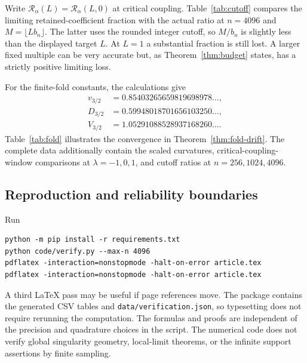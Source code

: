 \documentclass[11pt,a4paper]{article}
\numberwithin{equation}{section}
\theoremstyle{definition}
\theoremstyle{remark}
\newcommand{\Ra}{\mathcal R_\alpha}
\begin{document}
Write $\Ra(L)=\Ra(L,0)$ at critical coupling. Table~\ref{tab:cutoff}
compares the limiting retained-coefficient fraction with the actual
ratio at $n=4096$ and $M=\lfloor Lb_n\rfloor$. The latter uses the rounded
integer cutoff, so $M/b_n$ is slightly less than the displayed target
$L$. At $L=1$ a substantial fraction is still lost. A larger fixed
multiple can be very accurate but, as Theorem~\ref{thm:budget} states,
has a strictly positive limiting loss.
\begin{table}[htbp]
\centering\small

\caption{Critical action-cutoff profile and finite-sector diagnostics.
The two quadrature resolutions differed by at most $2.34\times10^{-12}$
in the computed truncated densities; this difference is a diagnostic,
not a rigorous error bound.}
\label{tab:cutoff}
\end{table}

For the finite-fold constants, the calculations give
\begin{align*}
 v_{3/2}&=0.85403265659819698978\ldots,\\
 D_{3/2}&=0.59948018701656103250\ldots,\\
 V_{3/2}&=1.05291088528937168260\ldots.
\end{align*}
Table~\ref{tab:fold} illustrates the convergence in
Theorem~\ref{thm:fold-drift}. The complete data additionally contain the
scaled curvatures, critical-coupling-window comparisons at
$\lambda=-1,0,1$, and cutoff ratios at $n=256,1024,4096$.
\begin{table}[htbp]
\centering\small

\caption{Moving finite-action folds. The two columns converge to
$v_{3/2}$ and $D_{3/2}$, respectively.}
\label{tab:fold}
\end{table}

\subsection{Reproduction and reliability boundaries}
Run
\begin{verbatim}
python -m pip install -r requirements.txt
python code/verify.py --max-n 4096
pdflatex -interaction=nonstopmode -halt-on-error article.tex
pdflatex -interaction=nonstopmode -halt-on-error article.tex
\end{verbatim}
A third LaTeX pass may be useful if page references move. The package
contains the generated CSV tables and \texttt{data/verification.json},
so typesetting does not require rerunning the computation. The formulas
and proofs are independent of the precision and quadrature choices in
the script. The numerical code does not verify global singularity
geometry, local-limit theorems, or the infinite support assertions by
finite sampling.
\end{document}
